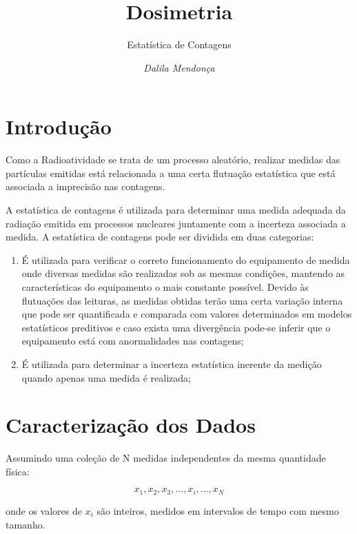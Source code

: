 \documentclass[11pt,a4paper]{article}
\title{\LobsterTwo\Huge{Dosimetria}}
\author{\LobsterTwo\Large{Estatística de Contagens\nocite{*}}}
\date{\LobsterTwo\textit{Dalila Mendonça}}
\begin{document}
	\maketitle


\section{Introdução}

  	Como a Radioatividade se trata de um processo aleatório, realizar medidas das partículas emitidas está 	relacionada a uma certa flutuação estatística que está associada a imprecisão nas contagens.

    A estatística de contagens é utilizada para determinar uma medida adequada da radiação emitida em processos nucleares juntamente com a incerteza associada a medida. A estatística de contagens pode ser dividida em duas categorias:

        \begin{enumerate}
          \item É utilizada para verificar o correto funcionamento do equipamento de medida onde diversas medidas são realizadas sob as mesmas condições, mantendo as características do equipamento o mais constante possível. Devido às flutuações das leituras, as medidas obtidas terão uma certa variação interna que pode ser quantificada e comparada com valores determinados em modelos estatísticos preditivos e caso exista uma divergência pode-se inferir que o equipamento está com anormalidades nas contagens;
          \item É utilizada para determinar a incerteza estatística inerente da medição quando apenas uma medida é realizada; 
        \end{enumerate}
    
\section{Caracterização dos Dados}

    Assumindo uma coleção de N medidas independentes da mesma quantidade física:

        \begin{equation*}
        	x_1,x_2, x_3, ... , x_i , ... , x_N
        \end{equation*}
        
    \noindent onde os valores de $x_i$ são inteiros, medidos em intervalos de tempo com mesmo tamanho.
\end{document}
